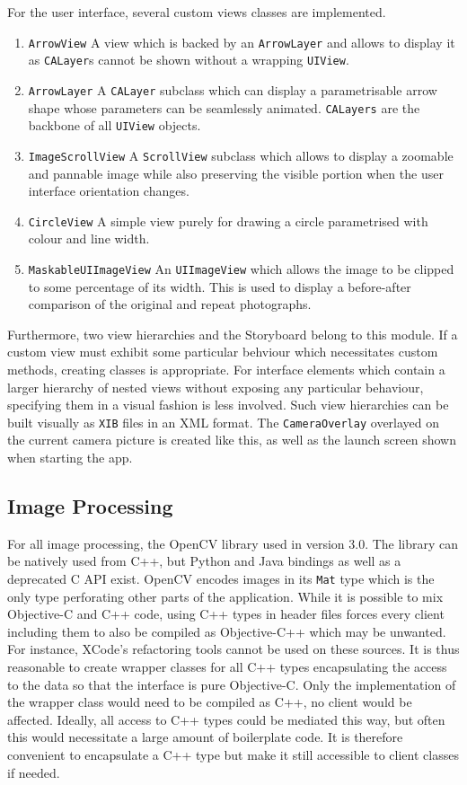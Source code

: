 For the user interface, several custom views classes are implemented.
\begin{enumerate}
   \item \texttt{ArrowView} A view which is backed by an \texttt{ArrowLayer} and
      allows to display it as \texttt{CALayer}s cannot be shown without a
      wrapping \texttt{UIView}.
   \item \texttt{ArrowLayer} A \texttt{CALayer} subclass which can display a
      parametrisable arrow shape whose parameters can be seamlessly animated.
      \texttt{CALayers} are the backbone of all \texttt{UIView} objects.
   \item \texttt{ImageScrollView} A \texttt{ScrollView} subclass which allows to
      display a zoomable and pannable image while also preserving the visible
      portion when the user interface orientation changes.
   \item \texttt{CircleView} A simple view purely for drawing a circle parametrised
      with colour and line width.
   \item \texttt{MaskableUIImageView} An \texttt{UIImageView} which allows the
      image to be clipped to some percentage of its width. This is used to
      display a before-after comparison of the original and repeat photographs.
\end{enumerate}
 
Furthermore, two view hierarchies and the Storyboard belong to this module.  If
a custom view must exhibit some particular behviour which necessitates custom
methods, creating classes is appropriate. For interface elements which contain a
larger hierarchy of nested views without exposing any particular behaviour,
specifying them in a visual fashion is less involved. Such view hierarchies can
be built visually as \texttt{XIB} files in an XML format. The
\texttt{CameraOverlay} overlayed on the current camera picture is created like
this, as well as the launch screen shown when starting the app.

\subsection{Image Processing}

For all image processing, the OpenCV library used in version 3.0. The library
can be natively used from C++, but Python and Java bindings as well as a
deprecated C API exist. OpenCV encodes images in its \texttt{Mat} type which is
the only type perforating other parts of the application. 
While it is possible to mix Objective-C and C++ code,
using C++ types in header files forces every client including them to also be
compiled as Objective-C++ which may be unwanted. For instance, XCode's
refactoring tools cannot be used on these sources. It is thus reasonable to create
wrapper classes for all C++ types encapsulating the access to the data so that
the interface is pure Objective-C. Only the implementation of the wrapper class
would need to be compiled as C++, no client would be affected. Ideally, all
access to C++ types could be mediated this way, but often this would necessitate 
a large amount of boilerplate code.
It is therefore convenient to encapsulate a C++ type but make it still accessible to
client classes if needed. 

